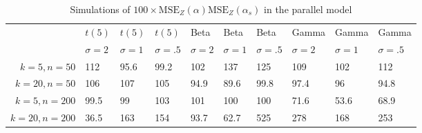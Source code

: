 \begin{table}[ht]
\centering
\caption{Simulations of $100 \times \textrm{MSE}_Z(\alpha)\textrm{MSE}_Z(\alpha_s)$ in the parallel model} 
\label{tab:simulation}
\begin{tabular}{rlllllllll}
    \toprule
  & $t(5)$ & $t(5)$ & $t(5)$ & Beta & Beta & Beta & Gamma & Gamma & Gamma \\
  \cmidrule(lr){2-4}\cmidrule(lr){5-7}\cmidrule(lr){8-10} 
  & $\sigma = 2$ & $\sigma = 1$ & $\sigma = .5$ & $\sigma = 2$ & $\sigma = 1$ & $\sigma = .5$ & $\sigma = 2$ & $\sigma = 1$ & $\sigma = .5$ \\
$k = 5, n = 50$ & 112 & 95.6 & 99.2 & 102 & 137 & 125 & 109 & 102 & 112 \\ 
  $k = 20, n = 50$ & 106 & 107 & 105 & 94.9 & 89.6 & 99.8 & 97.4 & 96 & 94.8 \\ 
  $k = 5, n = 200$ & 99.5 & 99 & 103 & 101 & 100 & 100 & 71.6 & 53.6 & 68.9 \\ 
  $k = 20, n = 200$ & 36.5 & 163 & 154 & 93.7 & 62.7 & 525 & 278 & 168 & 253 \\ 
    \bottomrule
\end{tabular}
\end{table}
